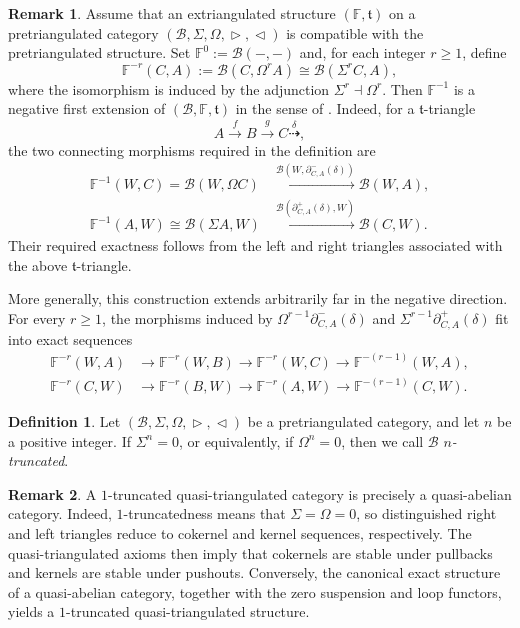 \documentclass[a4paper,reqno,10pt]{amsart}
\theoremstyle{definition}
\newtheorem{definition}[definition]{Definition}
\theoremstyle{definition}
\newtheorem{remark}[remark]{Remark}
\theoremstyle{definition}
\theoremstyle{definition}
\theoremstyle{plain}
\newcommand{\ft}{\mathfrak{t}}
\newcommand{\BF}{\mathbb{F}}
\newcommand{\CB}{\mathcal{B}}
\begin{document}
\color{blue}
\begin{remark}\label{rem:negative_extensions}
Assume that an extriangulated structure $(\BF,\ft)$ on a
pretriangulated category
$(\CB,\Sigma,\Omega,\vartriangleright,\vartriangleleft)$ is compatible
with the pretriangulated structure. Set $\BF^0:=\CB(-,-)$ and, for each
integer $r\geq 1$, define
\[
\BF^{-r}(C,A):=\CB(C,\Omega^r A)
\cong \CB(\Sigma^r C,A),
\]
where the isomorphism is induced by the adjunction
$\Sigma^r\dashv\Omega^r$. Then $\BF^{-1}$ is a negative first
extension of $(\CB,\BF,\ft)$ in the sense of
\cite[Definition~2.3]{AET23}. Indeed, for a $\ft$-triangle
\[
A\xrightarrow{f}B\xrightarrow{g}C
\overset{\delta}{\dashrightarrow},
\]
the two connecting morphisms required in the definition are
\[
\begin{split}
\BF^{-1}(W,C)=\CB(W,\Omega C)
&\xrightarrow{\CB(W,\partial^-_{C,A}(\delta))}
\CB(W,A),\\
\BF^{-1}(A,W)\cong\CB(\Sigma A,W)
&\xrightarrow{\CB(\partial^+_{C,A}(\delta),W)}
\CB(C,W).
\end{split}
\]
Their required exactness follows from the left and right triangles
associated with the above $\ft$-triangle.

More generally, this construction extends arbitrarily far in the
negative direction. For every $r\geq 1$, the morphisms induced by
$\Omega^{r-1}\partial^-_{C,A}(\delta)$ and
$\Sigma^{r-1}\partial^+_{C,A}(\delta)$ fit into exact sequences
\[
\begin{split}
\BF^{-r}(W,A)&\longrightarrow\BF^{-r}(W,B)
\longrightarrow\BF^{-r}(W,C)
\longrightarrow\BF^{-(r-1)}(W,A),\\
\BF^{-r}(C,W)&\longrightarrow\BF^{-r}(B,W)
\longrightarrow\BF^{-r}(A,W)
\longrightarrow\BF^{-(r-1)}(C,W).
\end{split}
\]
\end{remark}
\normalcolor


\begin{definition}
\label{def:n-trun_pretr}
Let $(\CB,\Sigma,\Omega,\vartriangleright,\vartriangleleft)$ be a
pretriangulated category, and let $n$ be a positive integer.
If $\Sigma^n=0$, or equivalently, if $\Omega^n=0$, then we call $\CB$
\emph{$n$-truncated}.
\end{definition}

\color{blue}

\begin{remark}
A $1$-truncated quasi-triangulated category is precisely a
quasi-abelian category. Indeed, $1$-truncatedness means that
$\Sigma=\Omega=0$, so distinguished right and left triangles reduce
to cokernel and kernel sequences, respectively. The
quasi-triangulated axioms then imply that cokernels are stable under
pullbacks and kernels are stable under pushouts. Conversely, the
canonical exact structure of a quasi-abelian category, together with
the zero suspension and loop functors, yields a $1$-truncated
quasi-triangulated structure.
\end{remark}
\end{document}
